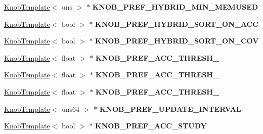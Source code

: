 \begin{DoxyCompactItemize}
\item 
\hypertarget{classall__knobs__c_af7192607afea3929519a06c3cf669566}{
\hyperlink{classKnobTemplate}{KnobTemplate}$<$ uns $>$ $\ast$ {\bfseries KNOB\_\-PREF\_\-HYBRID\_\-MIN\_\-MEMUSED}}
\label{classall__knobs__c_af7192607afea3929519a06c3cf669566}

\item 
\hypertarget{classall__knobs__c_a6a75da6640fc15547947a43d06ab23eb}{
\hyperlink{classKnobTemplate}{KnobTemplate}$<$ bool $>$ $\ast$ {\bfseries KNOB\_\-PREF\_\-HYBRID\_\-SORT\_\-ON\_\-ACC}}
\label{classall__knobs__c_a6a75da6640fc15547947a43d06ab23eb}

\item 
\hypertarget{classall__knobs__c_a2d7a8cb7e9cbfd59bd2f2bbd005f8ab1}{
\hyperlink{classKnobTemplate}{KnobTemplate}$<$ bool $>$ $\ast$ {\bfseries KNOB\_\-PREF\_\-HYBRID\_\-SORT\_\-ON\_\-COV}}
\label{classall__knobs__c_a2d7a8cb7e9cbfd59bd2f2bbd005f8ab1}

\item 
\hypertarget{classall__knobs__c_a78df84040455b4b50fb6bfbfb151de6f}{
\hyperlink{classKnobTemplate}{KnobTemplate}$<$ float $>$ $\ast$ {\bfseries KNOB\_\-PREF\_\-ACC\_\-THRESH\_}}
\label{classall__knobs__c_a78df84040455b4b50fb6bfbfb151de6f}

\item 
\hypertarget{classall__knobs__c_a9e55e8b91000acbad7b96ec4486d56c6}{
\hyperlink{classKnobTemplate}{KnobTemplate}$<$ float $>$ $\ast$ {\bfseries KNOB\_\-PREF\_\-ACC\_\-THRESH\_}}
\label{classall__knobs__c_a9e55e8b91000acbad7b96ec4486d56c6}

\item 
\hypertarget{classall__knobs__c_a18e52944de3007782a003d038e79e7f3}{
\hyperlink{classKnobTemplate}{KnobTemplate}$<$ float $>$ $\ast$ {\bfseries KNOB\_\-PREF\_\-ACC\_\-THRESH\_}}
\label{classall__knobs__c_a18e52944de3007782a003d038e79e7f3}

\item 
\hypertarget{classall__knobs__c_a18d171964a360bd99b3d1fe179daabd9}{
\hyperlink{classKnobTemplate}{KnobTemplate}$<$ uns64 $>$ $\ast$ {\bfseries KNOB\_\-PREF\_\-UPDATE\_\-INTERVAL}}
\label{classall__knobs__c_a18d171964a360bd99b3d1fe179daabd9}

\item 
\hypertarget{classall__knobs__c_ad021ef25e538e3d5f4d64ead03fc6d6c}{
\hyperlink{classKnobTemplate}{KnobTemplate}$<$ bool $>$ $\ast$ {\bfseries KNOB\_\-PREF\_\-ACC\_\-STUDY}}
\label{classall__knobs__c_ad021ef25e538e3d5f4d64ead03fc6d6c}


\end{DoxyCompactItemize}
